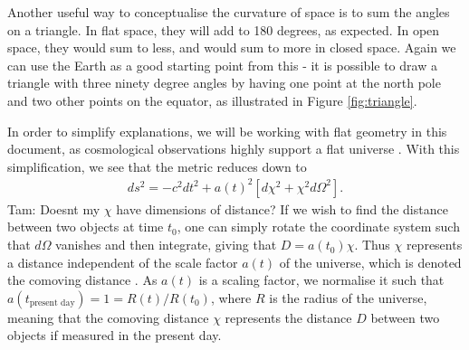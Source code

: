 \documentclass[titlesmallcaps, examinerscopy, copyrightpage]{uqthesis}
\newcommand{\red}{\color{red}}
\begin{document}
Another useful way to conceptualise the curvature of space is to sum the angles on a triangle. In flat space, they will add to 180 degrees, as expected. In open space, they would sum to less, and would sum to more in closed space. Again we can use the Earth as a good starting point from this - it is possible to draw a triangle with three ninety degree angles by having one point at the north pole and two other points on the equator, as illustrated in Figure \ref{fig:triangle}. 

In order to simplify explanations, we will be working with flat geometry in this document, as cosmological observations highly support a flat universe \citep{Planck201416, DavisMortsell2007,Mortonson2009}. With this simplification, we see that the metric reduces down to
\begin{align} \label{eq:flatmetric}
ds^2 = -c^2 dt^2 + a(t)^2 \left[ d\chi^2 + \chi^2 d\Omega^2 \right].
\end{align}
{\red Tam: Doesnt my $\chi$ have dimensions of distance?}
If we wish to find the distance between two objects at time $t_0$, one can simply rotate the coordinate system such that $d\Omega$ vanishes and then integrate, giving that $D = a(t_0) \chi$. Thus $\chi$ represents a distance independent of the scale factor $a(t)$ of the universe, which is denoted the comoving distance \citep{CarrollOstlie2006}.  As $a(t)$ is a scaling factor, we normalise it such that $a(t_{\text{present day}}) = 1 = R(t)/R(t_0)$, where $R$ is the radius of the universe, meaning that the comoving distance $\chi$ represents the distance $D$ between two objects if measured in the present day.
\end{document}

